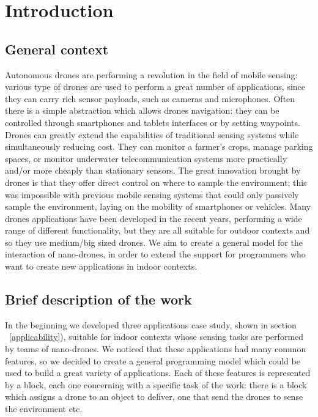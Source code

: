 \chapter{Introduction}
\label{cap1}


\section{General context}

Autonomous drones are performing a revolution in the field of mobile sensing:
various type of drones are used to perform a great number of applications, since they can carry rich sensor payloads, such as cameras and microphones.
Often there is a simple abstraction which allows drones navigation: they can be controlled through smartphones and tablets interfaces or by setting waypoints.
Drones can greatly extend the capabilities of traditional sensing systems while simultaneously reducing cost.
They can monitor a farmer’s crops, manage parking spaces, or monitor underwater telecommunication systems more practically and/or more cheaply than stationary sensors.
The great innovation brought by drones is that they offer direct control on where to sample the environment; this was impossible with previous mobile sensing systems that could only passively sample the environment, laying on the mobility of smartphones or vehicles.
Many drones applications have been developed in the recent years, performing a wide range of different functionality, but they are all suitable for outdoor contexts and so they use medium/big sized drones.
We aim to create a general model for the interaction of nano-drones, in order to extend the support for programmers who want to create new applications in indoor contexts.


\section{Brief description of the work}

In the beginning we developed three applications case study, shown in section ~\ref{applicability}), suitable for indoor contexts whose sensing tasks are performed by teams of nano-drones.
We noticed that these applications had many common features, so we decided to create a general programming model which could be used to build a great variety of applications.
Each of these features is represented by a block, each one concerning with a specific task of the work: there is a block which assigns a drone to an object to deliver, one that send the drones to sense the environment etc.
\\

